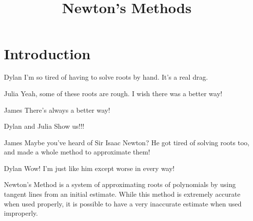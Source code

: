 \documentclass{ximera}
\title{Newton's Methods}
\begin{document}
\maketitle
\section{Introduction}
\begin{dialogue}
\item[Dylan] I'm so tired of having to solve roots by hand. It's a real drag.
\item[Julia] Yeah, some of these roots are rough. I wish there was a better way!
\item[James] There's always a better way!
\item[Dylan and Julia] Show us!!!
\item[James] Maybe you've heard of Sir Isaac Newton? He got tired of solving roots too, and made a whole method to approximate them!
\item[Dylan] Wow! I'm just like him except worse in every way!
\end{dialogue}
Newton's Method is a system of approximating roots of polynomials by using tangent lines from an initial estimate. While this method is extremely accurate when used properly, it is possible to have a very inaccurate estimate when used improperly.
\end{document}
